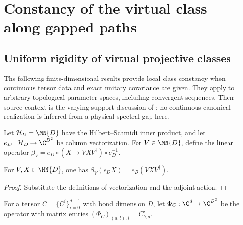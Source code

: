\section{Constancy of the virtual class along gapped paths}

\subsection{Uniform rigidity of virtual projective classes}

The following finite-dimensional results provide local class constancy when
continuous tensor data and exact unitary covariance are given. They apply
to arbitrary topological parameter spaces, including convergent sequences.
Their source context is the varying-support discussion of
\cite[Appendix~C, lines~2653--2717]{Schuch2011Phases}; no continuous
canonical realization is inferred from a physical spectral gap here.

\begin{definition}
    \label{def:spc_aux_adjoint_coordinates}
    \leanok
    Let $\mathcal H_D=\MN{D}$ have the Hilbert--Schmidt inner product, and
    let $e_D:\mathcal H_D\to\C^{D^2}$ be column vectorization. For
    $V\in\MN{D}$, define the linear operator
    $\beta_V=e_D\circ(X\mapsto VXV^\dagger)\circ e_D^{-1}$.
\end{definition}

\begin{lemma}
    \label{thm:spc_aux_adjoint_evaluation}
    \leanok
    For $V,X\in\MN{D}$, one has
    $\beta_V(e_DX)=e_D(VXV^\dagger)$.
\end{lemma}

\begin{proof}\leanok
    Substitute the definitions of vectorization and the adjoint action.
\end{proof}

\begin{definition}
    \label{def:spc_aux_coefficient_operator}
    \leanok
    For a tensor $C=\{C^i\}_{i=0}^{d-1}$ with bond dimension $D$, let
    $\Phi_C:\C^d\to\C^{D^2}$ be the operator with matrix entries
    $(\Phi_C)_{(a,b),i}=C^i_{b,a}$.
\end{definition}

